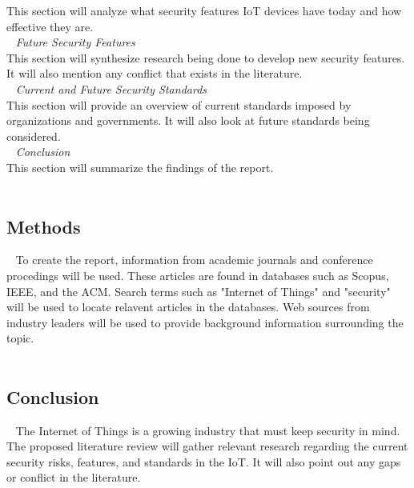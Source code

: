 \documentclass[letterpaper, 12pt]{texMemo}
\begin{document}
\begin{flushleft}
This section will analyze what security features IoT devices have today and how effective they are.\\
~\newline
\textit{Future Security Features}\\
This section will synthesize research being done to develop new security features. It will also mention any conflict that 
exists in the literature.\\
~\newline
\textit{Current and Future Security Standards}\\
This section will provide an overview of current standards imposed by organizations and governments. It will also look at 
future standards being considered.\\
~\newline
\textit{Conclusion}\\
This section will summarize the findings of the report.\\
~\newline

\subsection*{Methods}
~\newline
To create the report, information from academic journals and conference procedings will be used. These articles are found in 
databases such as Scopus, IEEE, and the ACM. Search terms such as "Internet of Things" and "security" will be used to locate
relavent articles in the databases. Web sources from industry leaders will be used to provide background information surrounding
the topic.\\ 
~\newline

\subsection*{Conclusion}
~\newline
The Internet of Things is a growing industry that must keep security in mind. The proposed literature review will gather relevant 
research regarding the current security risks, features, and standards in the IoT. It will also point out any gaps or conflict in
the literature. 


\end{flushleft}
\end{document}
